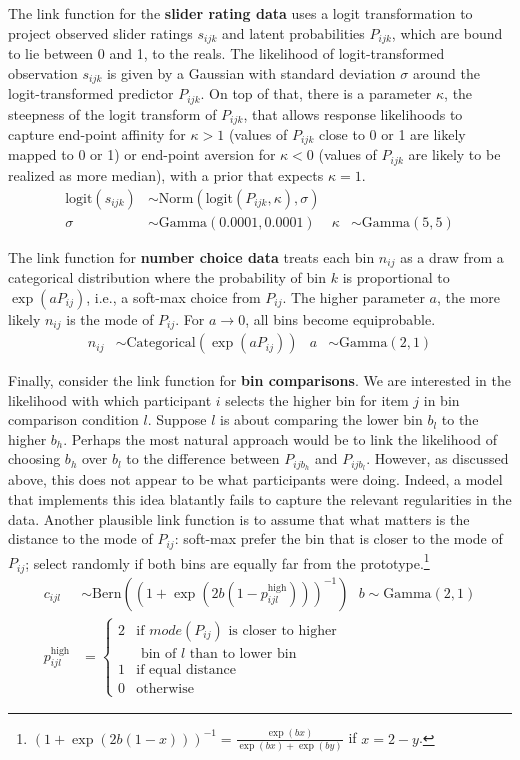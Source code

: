 \documentclass[10pt,letterpaper]{article}
\DeclareMathOperator{\expo}{exp}
\begin{document}
The link function for the \textbf{slider rating data} uses a logit transformation to project observed
slider ratings $s_{ijk}$ and latent probabilities $P_{ijk}$, which are bound to lie between 0
and 1, to the reals. The likelihood of logit-transformed observation $s_{ijk}$ is given by a
Gaussian with standard deviation $\sigma$ around the logit-transformed predictor $P_{ijk}$. On
top of that, there is a parameter $\kappa$, the steepness of the logit transform of $P_{ijk}$,
that allows response likelihoods to capture end-point affinity for $\kappa >1$ (values of
$P_{ijk}$ close to 0 or 1 are likely mapped to 0 or 1) or end-point aversion for $\kappa <0$
(values of $P_{ijk}$ are likely to be realized as more median), with a prior that expects
$\kappa=1$.
\begin{align*}
  \text{logit}(s_{ijk}) &\sim
        \text{Norm}(\text{logit}(P_{ijk}, \kappa), \sigma) \\
        \sigma &  \sim \text{Gamma}(0.0001,0.0001) & \kappa &\sim \text{Gamma}(5,5)
\end{align*}
 
The link function for \textbf{number choice data} treats each bin $n_{ij}$ as a draw from a categorical
distribution where the probability of bin $k$ is proportional to $\expo(a P_{ij})$, i.e., a
soft-max choice from $P_{ij}$. The higher parameter $a$, the more likely $n_{ij}$ is the mode
of $P_{ij}$. For $a \rightarrow 0$, all bins become equiprobable.
\begin{align*}
  n_{ij} & \sim
        \text{Categorical}(\expo(a P_{ij})) &
 a & \sim \text{Gamma}(2,1)
\end{align*}

Finally, consider the link function for \textbf{bin comparisons}. We are interested in the
likelihood with which participant $i$ selects the higher bin for item $j$ in bin comparison
condition $l$. Suppose $l$ is about comparing the lower bin $b_l$ to the higher $b_h$. 
Perhaps the most natural approach would be to link the likelihood of choosing $b_h$ over $b_l$ to
the difference between $P_{ijb_h}$ and $P_{ijb_l}$. However, as discussed above, this does not
appear to be what participants were doing. Indeed, a model that implements this idea blatantly
fails to capture the relevant regularities in the data. Another plausible link function is to
assume that what matters is the distance to the mode of $P_{ij}$: soft-max prefer the bin that
is closer to the mode of $P_{ij}$; select randomly if both bins are equally far from the
prototype.\footnote{$(1 + \exp(2b(1-x)) )^{-1} = \frac{\exp(b x)}{\exp(b
    x) + \exp(b y)}$
  if $x = 2 - y$.}
\begin{align*}
  c_{ijl} & \sim \text{Bern}( (1 + \exp(2b(1-p^{\text{high}}_{ijl})) )^{-1} ) \ \ \ 
  b  \sim \text{Gamma}(2,1) \\
  p^\text{high}_{ijl} & = \begin{cases}
    2 & \text{if $mode(P_{ij})$ is closer to higher} \\
    & \text{ bin of $l$ than to lower bin } \\ 1 & \text{if equal
      distance} \\ 0 & \text{otherwise}  
  \end{cases}
\end{align*}
\end{document}
